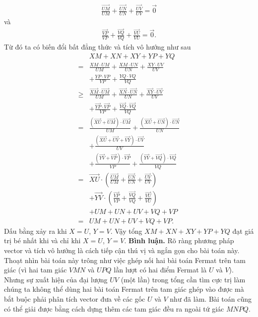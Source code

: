 \begin{multicols}{2}
\begin{align*}
			\frac{\overrightarrow{UM}}{UM}+\frac{\overrightarrow{UN}}{UN}+\frac{\overrightarrow{UV}}{UV}=\overrightarrow{0}
		\end{align*}
		và
		\begin{align*}
			\frac{\overrightarrow{VP}}{VP}+\frac{\overrightarrow{VQ}}{VQ}+\frac{\overrightarrow{VU}}{VU}=\overrightarrow{0}.
		\end{align*}
		Từ đó ta có biến đổi bất đẳng thức và tích vô hướng như sau
		\begin{align*}&XM+XN+XY+YP+YQ\\
			=&\frac{XM\cdot UM}{UM}+\frac{XM\cdot UN}{UN}+\frac{XY\cdot UV}{UV}\\
			&+\frac{YP\cdot VP}{VP}+\frac{YQ\cdot VQ}{VQ}\\
			\ge&\frac{\overrightarrow{XM}\cdot \overrightarrow{UM}}{UM}+\frac{\overrightarrow{XN}\cdot \overrightarrow{UN}}{UN}+\frac{\overrightarrow{XY}\cdot \overrightarrow{UV}}{UV}\\
			&+\frac{\overrightarrow{YP}\cdot \overrightarrow{VP}}{VP}+\frac{\overrightarrow{YQ}\cdot\overrightarrow{VQ}}{VQ}\\
			=&\frac{(\overrightarrow{XU}+\overrightarrow{UM})\cdot \overrightarrow{UM}}{UM}+\frac{(\overrightarrow{XU}+\overrightarrow{UN})\cdot \overrightarrow{UN}}{UN}\\
			&+\frac{(\overrightarrow{XU}+\overrightarrow{UV}+\overrightarrow{VY})\cdot \overrightarrow{UV}}{UV}\\
			&+\frac{(\overrightarrow{YV}+\overrightarrow{VP})\cdot \overrightarrow{VP}}{VP}+\frac{(\overrightarrow{YV}+\overrightarrow{VQ})\cdot\overrightarrow{VQ}}{VQ}\\
			=&\overrightarrow{XU}\cdot\left(\frac{\overrightarrow{UM}}{UM}+\frac{\overrightarrow{UN}}{UN}+\frac{\overrightarrow{UV}}{UV}\right)\\
			&+\overrightarrow{YV}\cdot\left(\frac{\overrightarrow{VP}}{VP}+\frac{\overrightarrow{VQ}}{VQ}+\frac{\overrightarrow{VU}}{VU}\right)\\
			&+UM+UN+UV+VQ+VP\\
			=&UM+UN+UV+VQ+VP.
		\end{align*}
		Dấu bằng xảy ra khi $X=U$, $Y=V$. Vậy tổng $XM+XN+XY+YP+YQ$ đạt giá trị bé nhất khi và chỉ khi $X=U$, $Y=V$.
	\vskip 0.1cm
	{\bf\color{cackithi} Bình luận.} Rõ ràng phương pháp vector và tích vô hướng là cách tiếp cận thú vị và ngắn gọn cho bài toán này. Thoạt nhìn bài toán này trông như việc ghép nối hai bài toán Fermat trên tam giác (vì hai tam giác $VMN$ và $UPQ$ lần lượt có hai điểm Fermat là $U$ và $V$). Nhưng sự xuất hiện của đại lượng $UV$ (một lần) trong tổng cần tìm cực trị làm chúng ta không thể dùng hai bài toán Fermat trên tam giác ghép vào được mà bắt buộc phải phân tích vector đưa về các gốc $U$ và $V$ như đã làm. Bài toán cũng có thể giải được bằng cách dựng thêm các tam giác đều ra ngoài tứ giác $MNPQ$.

\end{multicols}
